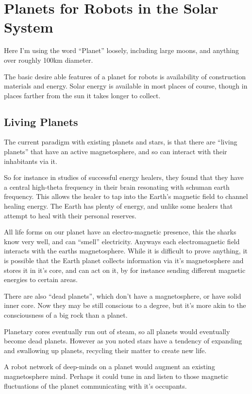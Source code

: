 \chapter{Planets for Robots in the Solar System}\label{robotPlanets}


Here I'm using the word ``Planet'' loosely, including large moons, and anything
over roughly 100km diameter. 

The basic desire able features of a planet for robots is availability of
construction materials and energy. Solar energy is available in most places of 
course, though in places farther from the sun it takes longer to collect. 

\section{Living Planets}\label{livingplanets}
The current paradigm with existing planets and stars, is that there are ``living
planets'' that have an active magnetosphere, and so can interact with their
inhabitants via it.

So for instance in studies of successful energy healers, they found that they
have a central high-theta frequency in their brain resonating with schuman earth
frequency. This allows the healer to tap into the Earth's magnetic field to
channel healing energy. The Earth has plenty of energy, and unlike some healers
that attempt to heal with their personal reserves.

All life forms on our planet have an electro-magnetic presence, this the sharks
know very well, and can ``smell'' electricity. Anyways each electromagnetic field
interacts with the earths magnetosphere. While it is difficult to prove
anything, it is possible that the Earth planet collects information via it's
magnetosphere and stores it in it's core, and can act on it, by for instance
sending different magnetic energies to certain areas.

There are also ``dead planets'', which don't have a magnetosphere, or have solid
inner core. Now they may be still conscious to a degree, but it's more akin to
the consciousness of a big rock than a planet.

Planetary cores eventually run out of steam, so all planets would eventually
become dead planets. However as you noted stars have a tendency of expanding and
swallowing up planets, recycling their matter to create new life.

A robot network of deep-minds on a planet would augment an existing
magnetosphere mind. Perhaps it could tune in and listen to those magnetic
fluctuations of the planet communicating with it's occupants.

